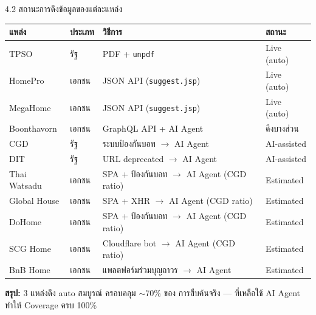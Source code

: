 \documentclass[aspectratio=169,11pt]{beamer}
\begin{document}
\begin{frame}{4.2 สถานะการดึงข้อมูลของแต่ละแหล่ง}
  \scriptsize
  \begin{table}
    \centering
    \begin{tabularx}{\textwidth}{l l X X}
      \toprule
      \textbf{แหล่ง} & \textbf{ประเภท} & \textbf{วิธีการ} & \textbf{สถานะ} \\
      \midrule
      TPSO         & รัฐ          & PDF + \texttt{unpdf}                              & \textcolor{green2}{Live (auto)} \\
      HomePro      & เอกชน        & JSON API (\texttt{suggest.jsp})                   & \textcolor{green2}{Live (auto)} \\
      MegaHome     & เอกชน        & JSON API (\texttt{suggest.jsp})                   & \textcolor{green2}{Live (auto)} \\
      \midrule
      Boonthavorn  & เอกชน        & GraphQL API + AI Agent                            & \textcolor{teal2}{ดึงบางส่วน} \\
      \midrule
      CGD          & รัฐ          & ระบบป้องกันบอท $\to$ AI Agent                     & \textcolor{red2}{AI-assisted} \\
      DIT          & รัฐ          & URL deprecated $\to$ AI Agent                     & \textcolor{red2}{AI-assisted} \\
      Thai Watsadu & เอกชน        & SPA + ป้องกันบอท $\to$ AI Agent (CGD ratio)        & \textcolor{red2}{Estimated} \\
      Global House & เอกชน        & SPA + XHR $\to$ AI Agent (CGD ratio)              & \textcolor{red2}{Estimated} \\
      DoHome       & เอกชน        & SPA + ป้องกันบอท $\to$ AI Agent (CGD ratio)        & \textcolor{red2}{Estimated} \\
      SCG Home     & เอกชน        & Cloudflare bot $\to$ AI Agent (CGD ratio)         & \textcolor{red2}{Estimated} \\
      BnB Home     & เอกชน        & แพลตฟอร์มร่วมบุญถาวร $\to$ AI Agent                & \textcolor{red2}{Estimated} \\
      \bottomrule
    \end{tabularx}
  \end{table}
  \vspace{0.3em}
  \footnotesize\textbf{สรุป:} 3 แหล่งดึง auto สมบูรณ์ ครอบคลุม $\sim$70\% ของ
  การสืบค้นจริง — ที่เหลือใช้ AI Agent ทำให้ Coverage ครบ 100\%
\end{frame}
\end{document}

